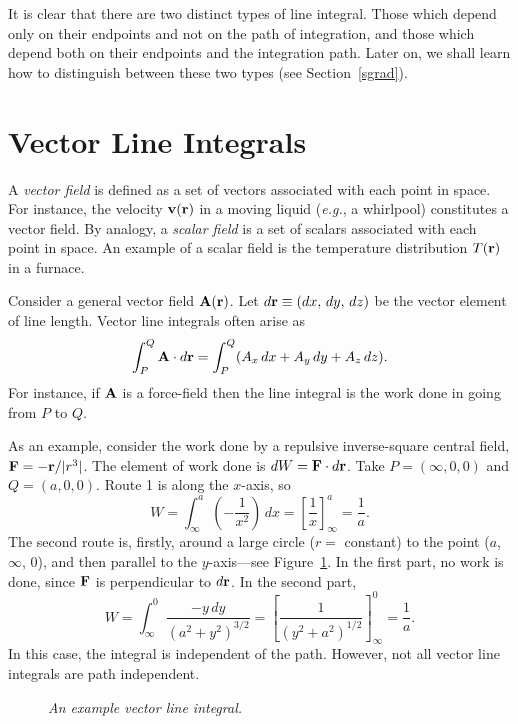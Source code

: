 It is clear that there are two distinct types of line integral. Those which depend only on their
endpoints and not on the path of integration, and those which depend  both on their endpoints
and the integration path. Later on, we shall learn how to distinguish between these two types (see Section~\ref{sgrad}).

\section{Vector Line Integrals}
A {\em vector field}\/ is defined as a set of vectors associated with each point in space.
For instance, the velocity ${\bf v}({\bf r})$ in a moving liquid 
({\em e.g.}, a whirlpool) constitutes
a vector field. By analogy, a {\em scalar field}\/ is a set of scalars associated with each
point in space. An example of a scalar field is the temperature distribution $T({\bf r})$ in
a furnace. 

Consider a general vector field ${\bf A}({\bf r})$. Let $d{\bf r} \equiv (dx,\,dy,\,dz)$ be the
vector element of line length. Vector line integrals often arise as 
\begin{equation}
\int_P^Q {\bf A}\cdot d{\bf r} = \int_P^Q (A_x\,dx+A_y\,dy + A_z\,dz).
\end{equation}
For instance, if ${\bf A}$ is a force-field then the line integral is the work done in going from
$P$ to $Q$. 

As an example, consider the work done by a repulsive inverse-square 
central field, ${\bf F} = - {\bf r}/ |r^3|$. The 
element of work done  is $dW={\bf F}\cdot d{\bf r}$. 
Take $P=(\infty, 0, 0)$ and $Q=(a,0,0)$. Route 1 is along the $x$-axis, so 
\begin{equation}
W = \int_{\infty}^a \left(-\frac{1}{x^2}\right)\,dx = \left[\frac{1}{x}\right]_{\infty}^a
=\frac{1}{a}.
\end{equation}
The second route is, firstly, around a large circle ($r=$ constant) to the point
($a$, $\infty$, 0), and then parallel to the $y$-axis---see Figure~\ref{f13a}. In the first  part, no work is 
done,
since ${\bf F}$ is perpendicular to $d{\bf r}$. In the second part,
\begin{equation}
W = \int_{\infty}^0 \frac{-y\,dy}{(a^2 + y^2)^{3/2}} = \left[\frac{1}{(y^2+a^2)^{1/2}}
\right]^0_\infty = \frac{1}{a}.
\end{equation}
In this case, the integral is independent of the path. However, not all vector line integrals
are path independent.

\begin{figure}
\epsfysize=2.25in
\centerline{}
\caption{\em An example vector line integral.}\label{f13a}
\end{figure}


